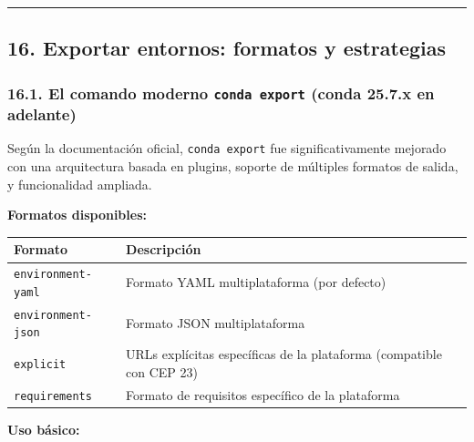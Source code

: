 \documentclass[
  doc,
  floatsintext,
  longtable,
  a4paper,
  nolmodern,
  notxfonts,
  notimes,
  12pt,
  colorlinks=true,linkcolor=blue,citecolor=blue,urlcolor=blue]{apa7}
\newcounter{none} %
\begin{document}
\begin{center}\rule{0.5\linewidth}{0.5pt}\end{center}

\subsection{16. Exportar entornos: formatos y
estrategias}\label{exportar-entornos-formatos-y-estrategias}

\subsubsection{\texorpdfstring{16.1. El comando moderno
\texttt{conda\ export} (conda 25.7.x en
adelante)}{16.1. El comando moderno conda export (conda 25.7.x en adelante)}}\label{el-comando-moderno-conda-export-conda-25.7.x-en-adelante}

Según la documentación oficial, \texttt{conda\ export} fue
significativamente mejorado con una arquitectura basada en plugins,
soporte de múltiples formatos de salida, y funcionalidad ampliada.

\textbf{Formatos disponibles:}

{\def\LTcaptype{none} %
\begin{longtable}[]{@{}
  >{\raggedright\arraybackslash}p{}
  >{\raggedright\arraybackslash}p{}@{}}
\toprule\noalign{}
\begin{minipage}[b]{\linewidth}\raggedright
Formato
\end{minipage} & \begin{minipage}[b]{\linewidth}\raggedright
Descripción
\end{minipage} \\
\midrule\noalign{}
\endhead
\bottomrule\noalign{}
\endlastfoot
\texttt{environment-yaml} & Formato YAML multiplataforma (por
defecto) \\
\texttt{environment-json} & Formato JSON multiplataforma \\
\texttt{explicit} & URLs explícitas específicas de la plataforma
(compatible con CEP 23) \\
\texttt{requirements} & Formato de requisitos específico de la
plataforma \\
\end{longtable}
}

\textbf{Uso básico:}
\end{document}
